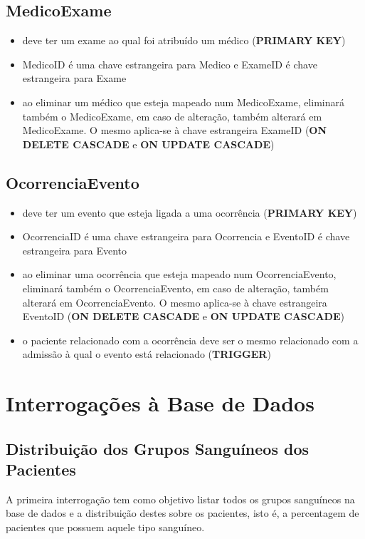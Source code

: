 \documentclass[article, a4paper, 12pt, oneside]{memoir}
\begin{document}
\section*{MedicoExame}
\begin{itemize}
	\item deve ter um exame ao qual foi atribuído um médico (\textbf{PRIMARY KEY})
	\item MedicoID é uma chave estrangeira para Medico e ExameID é chave estrangeira para Exame
	\item ao eliminar um médico que esteja mapeado num MedicoExame, eliminará também o MedicoExame, em caso de alteração, também alterará em MedicoExame. O mesmo aplica-se à chave estrangeira ExameID (\textbf{ON DELETE CASCADE} e \textbf{ON UPDATE CASCADE})
\end{itemize}

\newpage

\section*{OcorrenciaEvento}
\begin{itemize}
	\item deve ter um evento que esteja ligada a uma ocorrência (\textbf{PRIMARY KEY})
	\item OcorrenciaID é uma chave estrangeira para Ocorrencia e EventoID é chave estrangeira para Evento
	\item ao eliminar uma ocorrência que esteja mapeado num OcorrenciaEvento, eliminará também o OcorrenciaEvento, em caso de alteração, também alterará em OcorrenciaEvento. O mesmo aplica-se à chave estrangeira EventoID (\textbf{ON DELETE CASCADE} e \textbf{ON UPDATE CASCADE})
	\item o paciente relacionado com a ocorrência deve ser o mesmo relacionado com a admissão à qual o evento está relacionado (\textbf{TRIGGER})
\end{itemize}

\newpage
\chapter[Interrogações][Interrogações]{Interrogações à Base de Dados} \label{\thechapter}

\section{Distribuição dos Grupos Sanguíneos dos Pacientes}
A primeira interrogação tem como objetivo listar todos os grupos sanguíneos na base de dados e a distribuição destes sobre os pacientes, isto é, a percentagem de pacientes que possuem aquele tipo sanguíneo.
\end{document}

